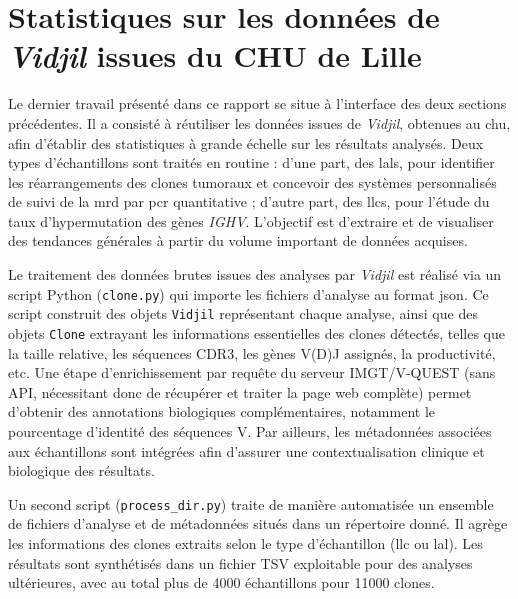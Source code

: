 


\section{Statistiques sur les données de \textit{Vidjil} issues du CHU de Lille}

Le dernier travail présenté dans ce rapport se situe à l'interface des deux
sections précédentes. Il a consisté à réutiliser les données issues de
\textit{Vidjil}, obtenues au \gls{chu}, afin d'établir des statistiques à
grande échelle sur les résultats analysés. Deux types d'échantillons sont
traités en routine : d'une part, des \glspl{lal}, pour identifier les
réarrangements des clones tumoraux et concevoir des systèmes personnalisés de
suivi de la \gls{mrd} par \gls{pcr} quantitative ; d'autre part, des
\glspl{llc}, pour l'étude du taux d'hypermutation des gènes \textit{IGHV}.
L'objectif est d'extraire et de visualiser des tendances générales à partir du
volume important de données acquises.

\vspace{1em}

Le traitement des données brutes issues des analyses par \textit{Vidjil} est
réalisé via un script Python (\texttt{clone.py}) qui importe les fichiers
d'analyse au format \gls{json}. Ce script construit des objets \texttt{Vidjil}
représentant chaque analyse, ainsi que des objets \texttt{Clone} extrayant les
informations essentielles des clones détectés, telles que la taille relative,
les séquences CDR3, les gènes V(D)J assignés, la productivité, etc. Une étape
d'enrichissement par requête du serveur IMGT/V-QUEST (sans API, nécessitant
donc de récupérer et traiter la page web complète) permet d'obtenir des
annotations biologiques complémentaires, notamment le pourcentage d'identité
des séquences V. Par ailleurs, les métadonnées associées aux échantillons sont
intégrées afin d'assurer une contextualisation clinique et biologique des
résultats.

\vspace{1em}

Un second script (\texttt{process\_dir.py}) traite de manière automatisée un
ensemble de fichiers d'analyse et de métadonnées situés dans un répertoire
donné. Il agrège les informations des clones extraits selon le type
d'échantillon (\gls{llc} ou \gls{lal}). Les résultats sont synthétisés dans un
fichier TSV exploitable pour des analyses ultérieures, avec au total plus de
4000 échantillons pour 11000 clones.


